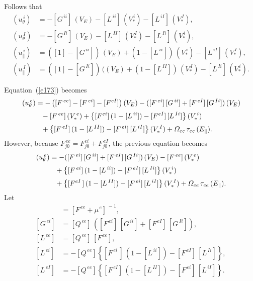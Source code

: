 \documentclass[12pt]{article}
\begin{document}
Follows that
\begin{align}
(u_\theta^{\,i}) &= -[G^{\,ii}]\,(V_E)-[L^{\,ii}]\,(V_\ast^{\,i})-[L^{\,iI}]\,(V_\ast^{\,I}),\\[0.5ex]
(u_\theta^{\,I}) &= -[G^{\,Ii}]\,(V_E)- [L^{\,II}]\,(V_\ast^{\,I}) - [L^{\,Ii}]\,(V_\ast^{\,i}),\\[0.5ex]
(u_\parallel^{\,i}) &= ([1]-[G^{\,ii}])\,(V_E) + (1-[L^{\,ii}])\,(V_\ast^{\,i}) -[L^{\,iI}]\,(V_\ast^{\,I}),\\[0.5ex]
(u_\parallel^{\,I}) &= ([1]-[G^{\,Ii}])\,((V_E) + (1-[L^{\,II}])\,(V_\ast^{\,I}) -[L^{\,Ii}]\,(V_\ast^{\,i}).
\end{align}

Equation~(\ref{e173}) becomes 
\begin{align}
[F^{\,ee}+\mu^{\,e}]\,(u_\theta^{\,e})& = -\left([F^{\,ee}]-[F^{\,ei}]-[F^{eI}]\right)(V_E)-([F^{\,ei}]\,[G^{\,ii}]+ [F^{\,eI}]\,[G^{\,Ii}])\,(V_E)\nonumber\\[0.5ex]&
\phantom{=}-[F^{\,ee}]\,(V_\ast^{\,e})+ \left\{[F^{ei}]\,(1-[L^{\,ii}])-[F^{eI}]\,[L^{\,Ii}]\right\}(V_\ast^{\,i})\nonumber\\[0.5ex]
&\phantom{=}
+ \left\{[F^{\,eI}]\,(1-[L^{\,II}])-[F^{\,ei}]\,[L^{\,iI}]\right\}(V_\ast^{\,I})+{\mit\Omega}_{ee}\,\tau_{ee}\,(E_\parallel).
\end{align}
However, because $F^{\,ee}_{j0}=F^{ei}_{j0}+F^{\,eI}_{j0}$, the previous equation becomes
\begin{align}
[F^{\,ee}+\mu^{\,e}]\,(u_\theta^{\,e})& =-([F^{\,ei}]\,[G^{\,ii}]+ [F^{\,eI}]\,[G^{\,Ii}])\,(V_E)-[F^{\,ee}]\,(V_\ast^{\,e})\nonumber\\[0.5ex]
&\phantom{=}
+ \left\{[F^{\,ei}]\,(1-[L^{\,ii}])-[F^{\,eI}]\,[L^{\,Ii}]\right\}(V_\ast^{\,i})\nonumber\\[0.5ex]
&\phantom{=}
+ \left\{[F^{eI}\,]\,(1-[L^{\,II}])-[F^{\,ei}]\,[L^{\,iI}]\right\}(V_\ast^{\,I})+{\mit\Omega}_{ee}\,\tau_{ee}\,(E_\parallel).
\end{align}
Let
\begin{align}
[Q^{\,ee}] &= [F^{\,ee}+\mu^{\,e}]^{\,-1},\\[0.5ex]
[G^{\,ei}] &= [Q^{\,ee}]\,([F^{\,ei}]\,[G^{\,ii}]+ [F^{\,eI}]\,[G^{\,Ii}]),\\[0.5ex]
[L^{\,ee}] &= [Q^{\,ee}]\,[F^{\,ee}],\\[0.5ex]
[L^{\,ei}] &= -[Q^{\,ee}]\left\{[F^{\,ei}\,]\,(1-[L^{\,ii}])-[F^{\,eI}]\,[L^{\,Ii}]\right\},\\[0.5ex]
[L^{\,eI}] &= -[Q^{\,ee}]\left\{[F^{\,eI}]\,(1-[L^{\,II}])-[F^{\,ei}]\,[L^{\,iI}]\right\}.
\end{align}
\end{document}
